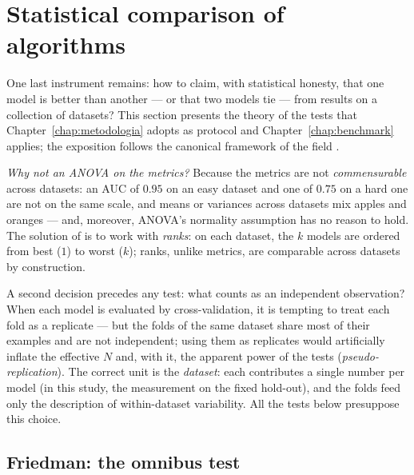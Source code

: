 \section{Statistical comparison of algorithms}
\label{sec:fund-estatistica}

One last instrument remains: how to claim, with statistical honesty,
that one model is better than another --- or that two models tie ---
from results on a collection of datasets? This section presents the
theory of the tests that Chapter~\ref{chap:metodologia} adopts as
protocol and Chapter~\ref{chap:benchmark} applies; the exposition
follows the canonical framework of the field
\citep{demsar2006,benavoli2017}.

\emph{Why not an ANOVA on the metrics?} Because the metrics are not
\emph{commensurable} across datasets: an AUC of $0.95$ on an easy
dataset and one of $0.75$ on a hard one are not on the same scale,
and means or variances across datasets mix apples and oranges ---
and, moreover, ANOVA's normality assumption has no reason to hold.
The solution of \citet{demsar2006} is to work with \emph{ranks}: on
each dataset, the $k$ models are ordered from best ($1$) to worst
($k$); ranks, unlike metrics, are comparable across datasets by
construction.

A second decision precedes any test: what counts as an independent
observation? When each model is evaluated by cross-validation, it is
tempting to treat each fold as a replicate --- but the folds of the
same dataset share most of their examples and are not independent;
using them as replicates would artificially inflate the effective
$N$ and, with it, the apparent power of the tests
(\emph{pseudo-replication}). The correct unit is the
\emph{dataset}: each contributes a single number per model (in this
study, the measurement on the fixed hold-out), and the folds feed
only the description of within-dataset variability. All the tests
below presuppose this choice.

\subsection{Friedman: the omnibus test}

